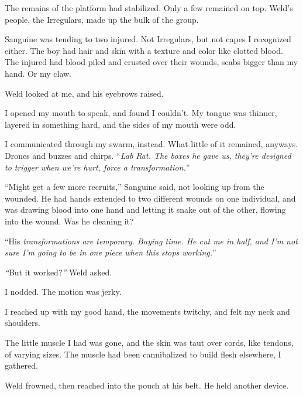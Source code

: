 The remains of the platform had stabilized.  Only a few remained on top.  Weld's people, the Irregulars, made up the bulk of the group.



Sanguine was tending to two injured.  Not Irregulars, but not capes I recognized either.  The boy had hair and skin with a texture and color like clotted blood.  The injured had blood piled and crusted over their wounds, scabs bigger than my hand.  Or my claw.



Weld looked at me, and his eyebrows raised.



I opened my mouth to speak, and found I couldn't.  My tongue was thinner, layered in something hard, and the sides of my mouth were odd.



I communicated through my swarm, instead.  What little of it remained, anyways.  Drones and buzzes and chirps.  ``\emph{Lab Rat.  The boxes he gave us, they're designed to trigger when we're hurt, force a transformation.}''



``Might get a few more recruits,'' Sanguine said, not looking up from the wounded.  He had hands extended to two different wounds on one individual, and was drawing blood into one hand and letting it snake out of the other, flowing into the wound.  Was he cleaning it?



``His \emph{transformations are temporary.  Buying time.  He cut me in half, and I'm not sure I'm going to be in one piece when this stops working.}''



\emph{``}But it worked?\emph{''  }Weld asked.



I nodded.  The motion was jerky.



I reached up with my good hand, the movements twitchy, and felt my neck and shoulders.



The little muscle I had was gone, and the skin was taut over cords, like tendons, of varying sizes.  The muscle had been cannibalized to build flesh elsewhere, I gathered.



Weld frowned, then reached into the pouch at his belt.  He held another device.



